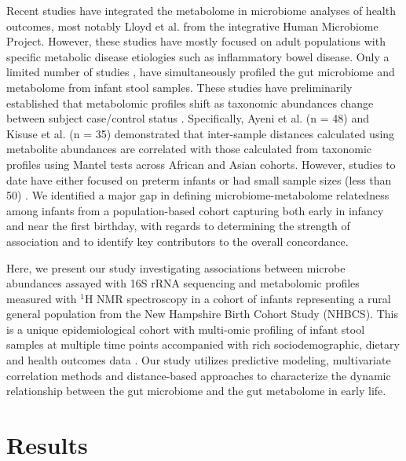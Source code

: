 Recent studies have integrated the metabolome in microbiome analyses of health outcomes, most notably Lloyd et al. \cite{lloyd-price2019multiomics} from the integrative Human Microbiome Project. However, these studies have mostly focused on adult populations with specific metabolic disease etiologies such as inflammatory bowel disease. Only a limited number of studies \cite{wandro2018microbiome, ayeni2018infant, stewart2017longitudinal, younge2019disrupted, brink2019early, kisuse2018urban}, have simultaneously profiled the gut microbiome and metabolome from infant stool samples. These studies have preliminarily established that metabolomic profiles shift as taxonomic abundances change between subject case/control status \cite{wandro2018microbiome, stewart2017longitudinal, younge2019disrupted, hill2017evolution}. Specifically, Ayeni et al. (n = 48) \cite{ayeni2018infant} and Kisuse et al. (n = 35) \cite{kisuse2018urban} demonstrated that inter-sample distances calculated using metabolite abundances are correlated with those calculated from taxonomic profiles using Mantel tests across African and Asian cohorts. However, studies to date have either focused on preterm infants \cite{wandro2018microbiome, stewart2017longitudinal, younge2019disrupted} or had small sample sizes (less than 50) \cite{ayeni2018infant, brink2019early, kisuse2018urban}. We identified a major gap in defining microbiome-metabolome relatedness among infants from a population-based cohort capturing both early in infancy and near the first birthday, with regards to determining the strength of association and to identify key contributors to the overall concordance. 

Here, we present our study investigating associations between microbe abundances assayed with 16S rRNA sequencing and metabolomic profiles measured with $^1$H NMR spectroscopy in a cohort of infants representing a rural general population from the New Hampshire Birth Cohort Study (NHBCS). This is a unique epidemiological cohort with multi-omic profiling of infant stool samples at multiple time points accompanied with rich sociodemographic, dietary and health outcomes data \cite{madan2016effects}. Our study utilizes predictive modeling, multivariate correlation methods and distance-based approaches to characterize the dynamic relationship between the gut microbiome and the gut metabolome in early life. 

\section{Results} 

